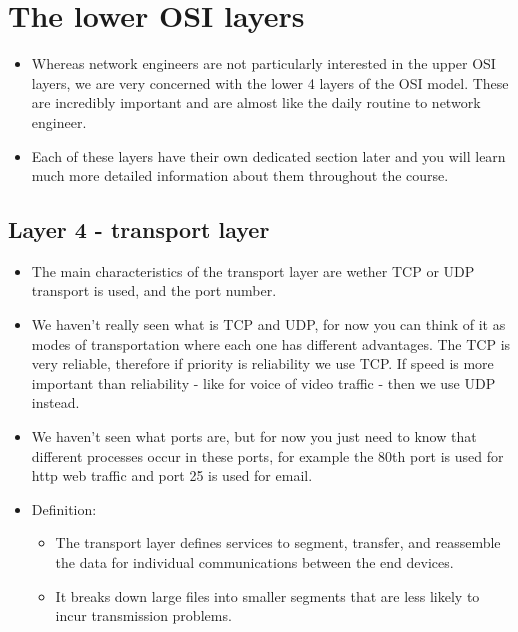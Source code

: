 \section{The lower OSI layers}
\begin{itemize}
    \item Whereas network engineers are not particularly interested in the upper OSI layers, we are very concerned with the lower 4 layers of the OSI model. These are incredibly important and are almost like the daily routine to network engineer.
    \item Each of these layers have their own dedicated section later and you will learn much more detailed information about them throughout the course.
\end{itemize}

\subsection{Layer 4 - transport layer}
\begin{itemize}
    \item The main characteristics of the transport layer are wether TCP or UDP transport is used, and the port number. 
    \item We haven't really seen what is TCP and UDP, for now you can think of it as modes of transportation where each one has different advantages. The TCP is very reliable, therefore if priority is reliability we use TCP. If speed is more important than reliability - like for voice of video traffic - then we use UDP instead.
    \item We haven't seen what ports are, but for now you just need to know that different processes occur in these ports, for example the 80th port is used for http web traffic and port 25 is used for email.
    \item Definition:
        \begin{itemize}
            \item The transport layer defines services to segment, transfer, and reassemble the data for individual communications between the end devices.
            \item It breaks down large files into smaller segments that are less likely to incur transmission problems.
        \end{itemize}
\end{itemize}

